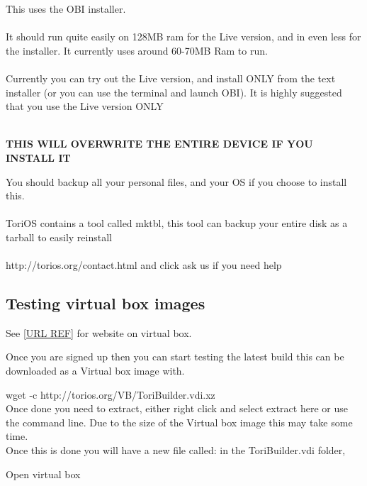 \documentclass[12pt,a4paper]{book}
\begin{document}
This uses the OBI installer. \\ \\
It should run quite easily on 128MB ram for the Live version, and in even less for the installer.  It currently uses around 60-70MB Ram to run. \\ \\
Currently you can try out the Live version, and install ONLY from the text installer (or you can use the terminal and launch OBI).
It is highly suggested that you use the Live version ONLY \\ \\

\begin{center}

\textbf{THIS WILL OVERWRITE THE ENTIRE DEVICE IF YOU 
INSTALL IT} \\

\end{center}

You should backup all your  personal files, and your OS if you choose to install this.\\ \\
ToriOS contains a tool called mktbl, this tool can backup your entire disk as a tarball to easily reinstall \\ \\
http://torios.org/contact.html and click ask us if you need help \\
 
\newpage

\subsection {Testing virtual box images}
See \ref{URL REF} for website on virtual box.

Once you are signed up then you can start testing the latest build this can be downloaded as a Virtual box image with.

wget -c http://torios.org/VB/ToriBuilder.vdi.xz \\

Once done you need to extract,   either right click and select extract here or use the command line.  Due to the size of the Virtual box image this may take some time. \\

Once this is done you will have a new file called:    in the ToriBuilder.vdi folder,  


Open virtual box
\end{document}
